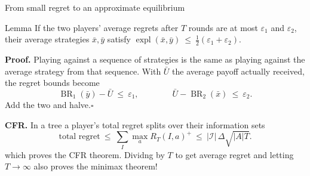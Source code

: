 \documentclass[10pt,aspectratio=169]{beamer}
\newcommand{\ex}{\operatorname{expl}}
\newcommand{\BR}{\operatorname{BR}}
\newcommand{\pos}[1]{{{#1}^{+}}}
\begin{document}
\begin{frame}{From small regret to an approximate equilibrium}
\begin{block}{Lemma}
If the two players' average regrets after $T$ rounds are at most $\varepsilon_1$ and $\varepsilon_2$, their average strategies
$\bar x,\bar y$ satisfy \quad $\ex(\bar x,\bar y)\ \le\ \tfrac12(\varepsilon_1+\varepsilon_2)$.
\end{block}
\pause
\textbf{Proof.} Playing against a sequence of strategies is the same as playing against the average strategy from that
sequence. With $\bar U$ the average payoff actually received, the regret bounds become
\[ \BR_1(\bar y)-\bar U\ \le\ \varepsilon_1, \qquad\qquad \bar U-\BR_2(\bar x)\ \le\ \varepsilon_2 . \]
Add the two and halve.\hfill$\square$

\pause
\textbf{CFR.} In a tree a player's total regret splits over their information sets
\[ \text{total regret}\ \le\ \textstyle\sum_I \max_a \pos{R_T(I,a)}\ \le\ |\mathcal I|\,\Delta\sqrt{|A|T} . \]
which proves the CFR theorem. Dividng by $T$ to get average regret and letting $T\to\infty$ also proves the minimax theorem!
\end{frame}
\end{document}
